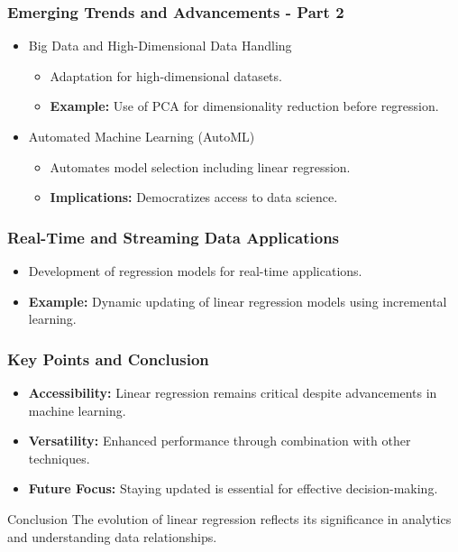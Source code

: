 \documentclass[aspectratio=169]{beamer}
\begin{document}
\begin{frame}[fragile]
    \frametitle{Emerging Trends and Advancements - Part 2}
    
    \begin{itemize}
        \item Big Data and High-Dimensional Data Handling
            \begin{itemize}
                \item Adaptation for high-dimensional datasets.
                \item \textbf{Example:} Use of PCA for dimensionality reduction before regression.
            \end{itemize}
        \item Automated Machine Learning (AutoML)
            \begin{itemize}
                \item Automates model selection including linear regression.
                \item \textbf{Implications:} Democratizes access to data science.
            \end{itemize}
    \end{itemize}
\end{frame}

\begin{frame}[fragile]
    \frametitle{Real-Time and Streaming Data Applications}
    \begin{itemize}
        \item Development of regression models for real-time applications.
        \item \textbf{Example:} Dynamic updating of linear regression models using incremental learning.
    \end{itemize}
\end{frame}

\begin{frame}[fragile]
    \frametitle{Key Points and Conclusion}
    \begin{itemize}
        \item \textbf{Accessibility:} Linear regression remains critical despite advancements in machine learning.
        \item \textbf{Versatility:} Enhanced performance through combination with other techniques.
        \item \textbf{Future Focus:} Staying updated is essential for effective decision-making.
    \end{itemize}
    \begin{block}{Conclusion}
        The evolution of linear regression reflects its significance in analytics and understanding data relationships.
    \end{block}
\end{frame}
\end{document}

